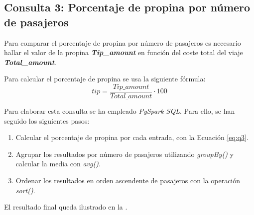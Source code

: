 
\newpage
\subsection{Consulta 3: Porcentaje de propina por número de pasajeros}
Para comparar el porcentaje de propina por número de pasajeros es necesario hallar el valor de la propina \textbf{\textit{Tip\_amount}} en función del coste total del viaje \textbf{\textit{Total\_amount}}.

Para calcular el porcentaje de propina se usa la siguiente fórmula:
\begin{equation}\label{eq:q3}
  tip = \frac{Tip\_amount}{Total\_amount} \cdot 100
\end{equation}


Para elaborar esta consulta se ha empleado \textit{PySpark SQL}. Para ello, se han seguido los siguientes pasos:
\begin{enumerate}
  \item Calcular el porcentaje de propina por cada entrada, con la Ecuación \ref{eq:q3}.
  \item Agrupar los resultados por número de pasajeros utilizando \textit{groupBy()} y calcular la media con \textit{avg()}.
  \item Ordenar los resultados en orden ascendente de pasajeros con la operación \textit{sort()}.
\end{enumerate}

\noindent
El resultado final queda ilustrado en la .

